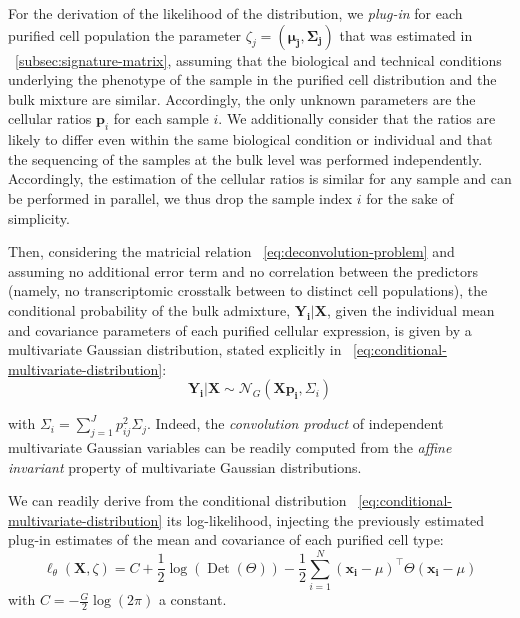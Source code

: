 \documentclass[long, final]{jobim}
\DeclareMathOperator*{\DET}{Det}
\begin{document}
For the derivation of the likelihood of the distribution, we \textit{plug-in} for each purified cell population the parameter $\zeta_j=\left(\boldsymbol{\mu_j}, \boldsymbol{\Sigma_j}\right)$ that was estimated in \sectionname~\ref{subsec:signature-matrix}, assuming that the biological and technical conditions underlying the phenotype of the sample in the purified cell distribution and the bulk mixture are similar. Accordingly, the only unknown parameters are the cellular ratios $\boldsymbol{p}_i$ for each sample $i$. We additionally consider that the ratios are likely to differ even within the same biological condition or individual and that the sequencing of the samples at the bulk level was performed independently. Accordingly, the estimation of the cellular ratios is similar for any sample and can be performed in parallel, we thus drop the sample index $i$ for the sake of simplicity. 

Then, considering the matricial relation \equationname ~\ref{eq:deconvolution-problem} and assuming no additional error term and no correlation between the predictors (namely, no transcriptomic crosstalk between to distinct cell populations), the conditional probability of the bulk admixture, $\boldsymbol{Y_{i}}|\boldsymbol{X}$, given the individual mean and covariance parameters of each purified cellular expression, is given by a multivariate Gaussian distribution, stated explicitly in \equationname~\ref{eq:conditional-multivariate-distribution}:
\begin{equation}
\label{eq:conditional-multivariate-distribution}
   \boldsymbol{Y_{i}}|\boldsymbol{X} \sim \mathcal{N}_G(\boldsymbol{X} \boldsymbol{p_i}, \Sigma_{i})
\end{equation}

with $\Sigma_{i}=\sum_{j=1}^J p_{ij}^2\Sigma_{j}$. Indeed, the \textit{convolution product} of independent multivariate Gaussian variables can be readily computed from the \textit{affine invariant} property of multivariate Gaussian distributions. 

We can readily derive from the conditional distribution \equationname~\ref{eq:conditional-multivariate-distribution} its log-likelihood, injecting the previously estimated plug-in estimates of the mean and covariance of each purified cell type:
\begin{equation}
    \label{eq:loglikelihood-multivariate-gaussian}
    \ell_{\theta}(\boldsymbol{X}, \zeta)=C + \frac{1}{2} \log\left(\DET(\Theta)\right) - \frac{1}{2} \sum_{i=1}^N (\boldsymbol{x_i} - \mu)^\top \Theta (\boldsymbol{x_i} - \mu)
\end{equation} with $C=-\frac{G}{2}\log(2\pi)$ a constant.
\end{document}
